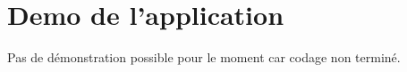  \part{Demo de l'application} %
 \label{prt:demo_ _de_ _l_'_application_}
 
 Pas de démonstration possible pour le moment car codage non terminé.
 

